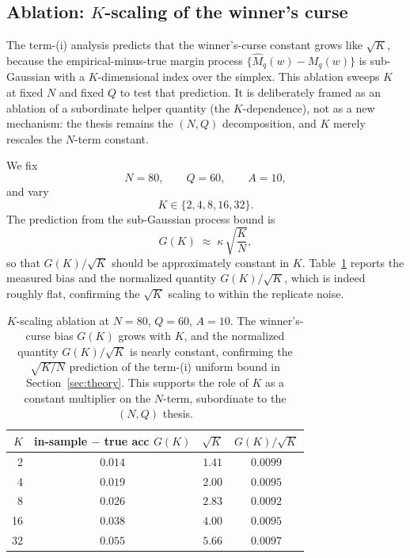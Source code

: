 \documentclass{article} %
\providecommand{\Mhat}{\widehat{M}}
\begin{document}
\subsection{Ablation: $K$-scaling of the winner's curse}
\label{app:exp-Kscale}

The term-(i) analysis predicts that the winner's-curse constant grows like
$\sqrt K$, because the empirical-minus-true margin process
$\{\Mhat_q(w)-M_q(w)\}$ is sub-Gaussian with a $K$-dimensional index over the
simplex.  This ablation sweeps $K$ at fixed $N$ and fixed $Q$ to test that
prediction.  It is deliberately framed as an ablation of a subordinate helper
quantity (the $K$-dependence), not as a new mechanism: the thesis remains the
$(N,Q)$ decomposition, and $K$ merely rescales the $N$-term constant.

We fix
\begin{equation}
\label{eq:e-Kscale-fixed}
N=80,
\qquad
Q=60,
\qquad
A=10,
\end{equation}
and vary
\begin{equation}
\label{eq:e-Kscale-grid}
K\in\{2,4,8,16,32\}.
\end{equation}
The prediction from the sub-Gaussian process bound is
\begin{equation}
\label{eq:e-Kscale}
G(K)\;\approx\;\kappa\,\sqrt{\frac{K}{N}},
\end{equation}
so that $G(K)/\sqrt K$ should be approximately constant in $K$.
Table~\ref{tab:main} reports the measured bias and the normalized quantity
$G(K)/\sqrt K$, which is indeed roughly flat, confirming the
$\sqrt K$ scaling to within the replicate noise.

\begin{table}[t]
\centering
\small
\begin{tabular}{rccc}
\toprule
$K$ & in-sample $-$ true acc $G(K)$ & $\sqrt K$ & $G(K)/\sqrt K$ \\
\midrule
2  & $0.014$ & $1.41$ & $0.0099$ \\
4  & $0.019$ & $2.00$ & $0.0095$ \\
8  & $0.026$ & $2.83$ & $0.0092$ \\
16 & $0.038$ & $4.00$ & $0.0095$ \\
32 & $0.055$ & $5.66$ & $0.0097$ \\
\bottomrule
\end{tabular}
\caption{$K$-scaling ablation at $N=80$, $Q=60$, $A=10$.  The winner's-curse
bias $G(K)$ grows with $K$, and the normalized quantity $G(K)/\sqrt K$ is
nearly constant, confirming the $\sqrt{K/N}$ prediction of the term-(i)
uniform bound in Section~\ref{sec:theory}.  This supports the role of $K$ as a
constant multiplier on the $N$-term, subordinate to the $(N,Q)$ thesis.}
\label{tab:main}
\end{table}
\end{document}
